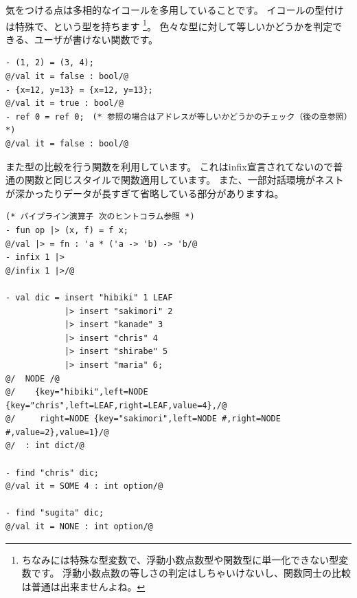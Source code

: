 \documentclass[11pt,a4paper]{article}
\begin{document}

気をつける点は多相的なイコールを多用していることです。
イコールの型付けは特殊で、という型を持ちます
\footnote{ちなみには特殊な型変数で、浮動小数点数型や関数型に単一化できない型変数です。
浮動小数点数の等しさの判定はしちゃいけないし、関数同士の比較は普通は出来ませんよね。}。
色々な型に対して等しいかどうかを判定できる、ユーザが書けない関数です。

\begin{lstlisting}[caption=イコールを乱用する,label=code:equal]
- (1, 2) = (3, 4);
@/val it = false : bool/@
- {x=12, y=13} = {x=12, y=13};
@/val it = true : bool/@
- ref 0 = ref 0;　(* 参照の場合はアドレスが等しいかどうかのチェック（後の章参照）*)
@/val it = false : bool/@
\end{lstlisting}

また型の比較を行う関数を利用しています。
これはinfix宣言されてないので普通の関数と同じスタイルで関数適用しています。
また、一部対話環境がネストが深かったりデータが長すぎて省略している部分がありますね。

\begin{lstlisting}[caption=dict型の利用,label=code:use-dict]
(* パイプライン演算子 次のヒントコラム参照 *)
- fun op |> (x, f) = f x;
@/val |> = fn : 'a * ('a -> 'b) -> 'b/@
- infix 1 |>
@/infix 1 |>/@

- val dic = insert "hibiki" 1 LEAF
            |> insert "sakimori" 2
            |> insert "kanade" 3
            |> insert "chris" 4
            |> insert "shirabe" 5
            |> insert "maria" 6;
@/  NODE /@
@/    {key="hibiki",left=NODE {key="chris",left=LEAF,right=LEAF,value=4},/@
@/     right=NODE {key="sakimori",left=NODE #,right=NODE #,value=2},value=1}/@
@/  : int dict/@

- find "chris" dic;
@/val it = SOME 4 : int option/@

- find "sugita" dic;
@/val it = NONE : int option/@
\end{lstlisting}
\end{document}
